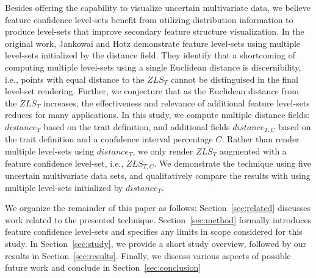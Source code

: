 Besides offering the capability to visualize uncertain multivariate data, we believe feature confidence level-sets benefit from utilizing distribution information to produce level-sets that improve secondary feature structure visualization.
%
In the original work, Jankowai and Hotz demonstrate feature level-sets using multiple level-sets initialized by the distance field.
%
They identify that a shortcoming of computing multiple level-sets using a single Euclidean distance is discernibility, i.e., points with equal distance to the $ZLS_{T}$ cannot be distinguised in the final level-set rendering.
%
Further, we conjecture that as the Euclidean distance from the $ZLS_{T}$ increases, the effectiveness and relevance of additional feature level-sets reduces for many applications.
%
In this study, we compute multiple distance fields: $distance_{T}$ based on the trait definition, and additional fields $distance_{T,C}$ based on the trait definition and a confidence interval percentage $C$. 
%
Rather than render multiple level-sets using $distance_{T}$, we only render $ZLS_{T}$ augmented with a feature confidence level-set, i.e., $ZLS_{T,C}$.
%
We demonstrate the technique using five uncertain multivariate data sets, and qualitatively compare the results with using multiple level-sets initialized by $distance_{T}$.

We organize the remainder of this paper as follows:
%
Section~\ref{sec:related} discusses work related to the presented technique. 
%
Section~\ref{sec:method} formally introduces feature confidence level-sets and specifies any limits in scope considered for this study.
%
In Section~\ref{sec:study}, we provide a short study overview, followed by our results in Section~\ref{sec:results}.
%
Finally, we discuss various aspects of possible future work and conclude in Section~\ref{sec:conclusion}

%

